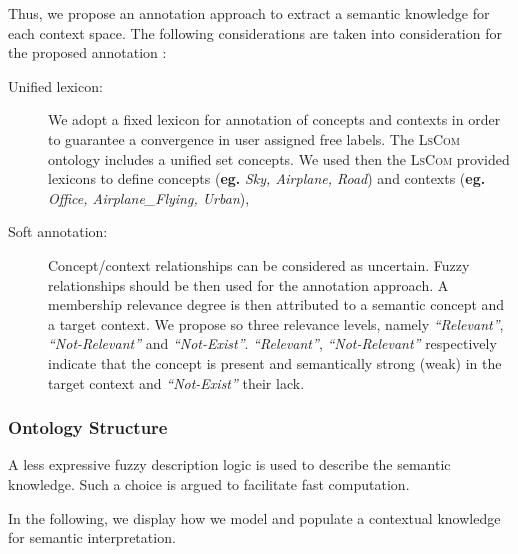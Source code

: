 					Thus, we propose an annotation approach to extract a semantic knowledge 
					for each context space. The following considerations are taken into consideration 
					for the proposed annotation :

						\begin{description} 
							\item[Unified lexicon:]  We adopt a fixed lexicon for annotation 
							of concepts and contexts in order to guarantee a convergence in 
							user assigned free labels. The \textsc{LsCom} ontology includes a 
							unified set  concepts. We used then the \textsc{LsCom} provided 
							lexicons to define concepts (\textbf{eg.} \textit{Sky, Airplane, 
							Road}) and contexts (\textbf{eg.} \textit{ Office, 
							Airplane\_Flying, Urban}),
							
							\item[Soft annotation:] Concept/context relationships can be considered 
							as uncertain. Fuzzy relationships should be then used for the
							annotation approach. A membership relevance degree is then 
							attributed to a semantic concept and a target context. We propose 
							so three relevance levels, namely\textit{ “Relevant”}, 
							\textit{“Not-Relevant”} and \textit{“Not-Exist”}.  
							\textit{“Relevant”}, \textit{“Not-Relevant”} respectively indicate 
							that the concept is present and semantically strong (weak) in the 
							target context and \textit{“Not-Exist”} their lack. 
						\end{description} 

					\subsubsection{Ontology Structure}  
						A less expressive fuzzy description logic is used to describe the 
						semantic knowledge. Such a choice is argued to facilitate fast computation.

						In the following, we display how we model and populate a contextual knowledge 
						for semantic interpretation.

